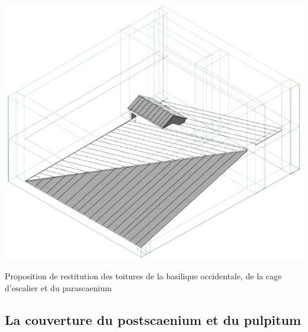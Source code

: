 		\begin{figureth}
			\includegraphics[width=\linewidth]{images/couvertureBadie}
			\caption[Toitures de basiliques par A.Badie]{Proposition de restitution des toitures de la \gls{basilique} occidentale, de la cage d'escalier et du \gls{parascaenium} \cite[Pl. XLVII]{orangePl}}
			\label{couvertureBadie}
		\end{figureth}	

		
		\subsection{La couverture du \gls{postscaenium} et du \gls{pulpitum}} \label{couverture}
		
